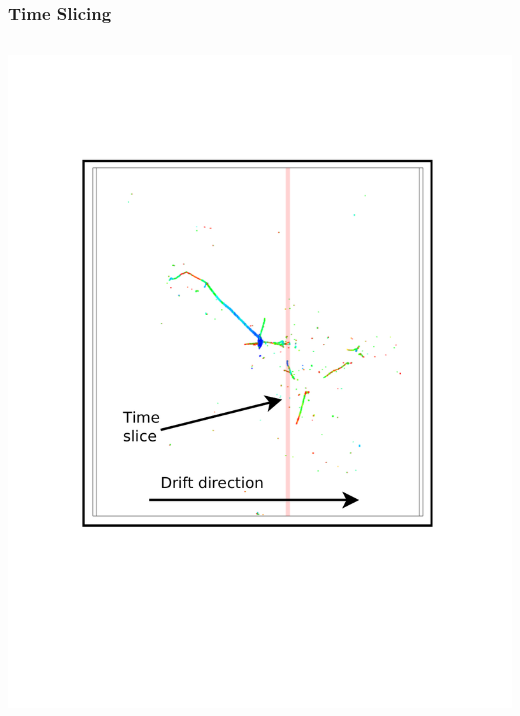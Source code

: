 \documentclass[xcolor=dvipsnames]{beamer}
\begin{document}
\begin{frame}[fragile]
  \frametitle{Time Slicing}
  
  \begin{columns}
    \begin{column}{0.35\textwidth}
      \begin{center}
        \vspace{-.5cm}

        \includegraphics[width=\textwidth]{slice.pdf}

        \vspace{-2cm}


\end{center}
\end{column}
\end{columns}
\end{frame}
\end{document}
